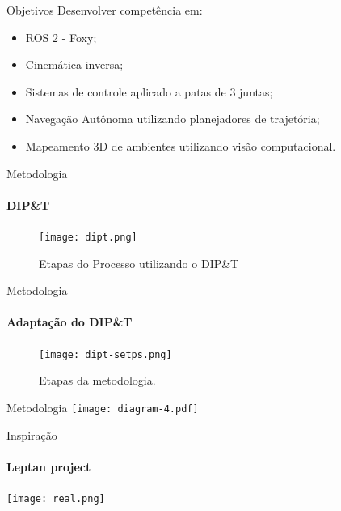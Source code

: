 \begin{frame}[t]{Objetivos}
    Desenvolver competência em:
    \begin{itemize}
        \item ROS 2 - Foxy;
        \item Cinemática inversa;
        \item Sistemas de controle aplicado a patas de 3 juntas;
        \item Navegação Autônoma utilizando planejadores de trajetória;
        \item Mapeamento 3D de ambientes utilizando visão computacional.
    \end{itemize}
\end{frame}

\begin{frame}[t]{Metodologia} 
    \framesubtitle{DIP\&T}
    \transdissolve[duration=0.5]
    \centering
    \begin{figure}
        
        \texttt{[image: dipt.png]}\\
        \caption{Etapas do Processo utilizando o DIP\&T}
    \end{figure}
    
\end{frame}

\begin{frame}[t]{Metodologia} 
    \framesubtitle{Adaptação do DIP\&T}
    \transdissolve[duration=0.5]
    \centering
    \begin{figure}
        \texttt{[image: dipt-setps.png]}\\
        \caption{Etapas da metodologia.}
    \end{figure}
    
\end{frame}


\begin{frame}[t]{Metodologia} 
    \transdissolve[duration=0.5]
    \centering
    \texttt{[image: diagram-4.pdf]}
\end{frame}



\begin{frame}[t]{Inspiração}
    \framesubtitle{Leptan project}

    \transdissolve[duration=0.5]
    \centering
    \texttt{[image: real.png]}

\end{frame}

